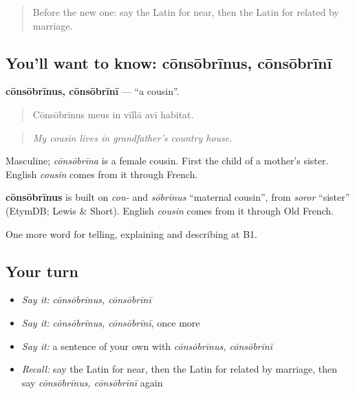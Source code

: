 \begin{quote}
Before the new one: say the Latin for near, then the Latin for related by marriage.
\end{quote}

\subsection*{You'll want to know: cōnsōbrīnus, cōnsōbrīnī}
\textbf{cōnsōbrīnus, cōnsōbrīnī} — \textquotedblleft{}a cousin\textquotedblright{}.

\begin{quote}
Cōnsōbrīnus meus in vīllā avī habitat.
\end{quote}

\begin{quote}
\emph{My cousin lives in grandfather's country house.}
\end{quote}

Masculine; \emph{cōnsōbrīna} is a female cousin. First the child of a mother's sister. English \emph{cousin} comes from it through French.

\begin{cousinweb}
\textbf{cōnsōbrīnus} is built on \emph{con-} and \emph{sōbrīnus} \textquotedblleft{}maternal cousin\textquotedblright{}, from \emph{soror} \textquotedblleft{}sister\textquotedblright{} (EtymDB; Lewis \& Short). English \emph{cousin} comes from it through Old French.
\end{cousinweb}

\begin{grammarlens}[title={What you've built}]
One more word for telling, explaining and describing at B1.
\end{grammarlens}

\subsection*{Your turn}
\begin{itemize}
\raggedright
  \item \emph{Say it:} \emph{cōnsōbrīnus, cōnsōbrīnī}
  \item \emph{Say it:} \emph{cōnsōbrīnus, cōnsōbrīnī}, once more
  \item \emph{Say it:} a sentence of your own with \emph{cōnsōbrīnus, cōnsōbrīnī}
  \item \emph{Recall:} say the Latin for near, then the Latin for related by marriage, then say \emph{cōnsōbrīnus, cōnsōbrīnī} again
\end{itemize}

